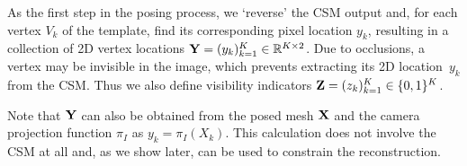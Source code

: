 
As the first step in the posing process, we `reverse' the CSM output and, for each vertex $V_k$ of the template, find its corresponding pixel location $y_k$, resulting in a collection of 2D vertex locations
$
\mathbf{Y} = (y_k)_{k = 1}^{K} \in \mathbb{R}^{K\times 2}
$.
Due to occlusions, a vertex may be invisible in the image, which prevents extracting its 2D location~$y_k$ from the CSM\@.
Thus we also define visibility indicators
$
\mathbf{Z} = (z_k)_{k = 1}^{K} \in \{0, 1\}^{K}
$.

Note that $\mathbf{Y}$ can also be obtained from the posed mesh $\mathbf{X}$ and the camera projection function $\pi_I$ as
$
y_k = \pi_I(X_k).
$
This calculation does not involve the CSM at all and, as we show later, can be used to constrain the reconstruction.




